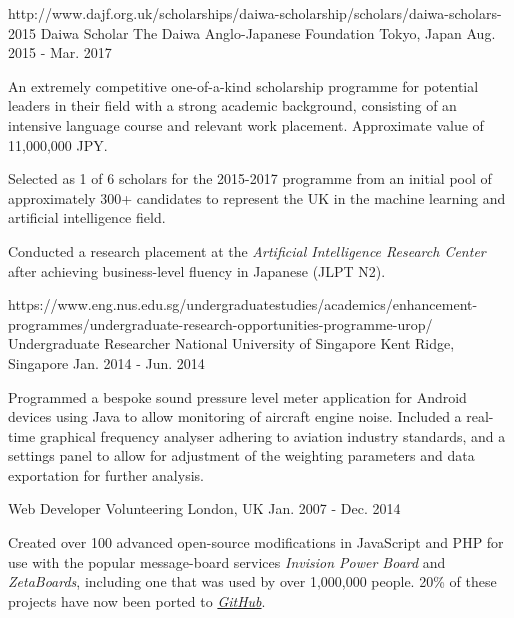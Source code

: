 \begin{cventries}
  \cventry
    {http://www.dajf.org.uk/scholarships/daiwa-scholarship/scholars/daiwa-scholars-2015}
    {Daiwa Scholar} %
    {The Daiwa Anglo-Japanese Foundation} %
    {Tokyo, Japan} %
    {Aug. 2015 - Mar. 2017} %
    {
      \begin{cvitems} %
        \item {An extremely competitive one-of-a-kind scholarship programme for potential leaders in their field with a strong academic background, consisting of an intensive language course and relevant work placement. Approximate value of 11,000,000 JPY.}
        \item {Selected as 1 of 6 scholars for the 2015-2017 programme from an initial pool of approximately 300+ candidates to represent the UK in the machine learning and artificial intelligence field.}
        \item {Conducted a research placement at the \emph{Artificial Intelligence Research Center} after achieving business-level fluency in Japanese (JLPT N2).}
      \end{cvitems}
    }

  \cventry
    {https://www.eng.nus.edu.sg/undergraduatestudies/academics/enhancement-programmes/undergraduate-research-opportunities-programme-urop/}
    {Undergraduate Researcher} %
    {National University of Singapore} %
    {Kent Ridge, Singapore} %
    {Jan. 2014 - Jun. 2014} %
    {
      \begin{cvitems} %
        \item {Programmed a bespoke sound pressure level meter application for Android devices using Java to allow monitoring of aircraft engine noise. Included a real-time graphical frequency analyser adhering to aviation industry standards, and a settings panel to allow for adjustment of the weighting parameters and data exportation for further analysis.}
      \end{cvitems}
    }

  \cventry
    {} %
    {Web Developer} %
    {Volunteering} %
    {London, UK} %
    {Jan. 2007 - Dec. 2014} %
    {
      \begin{cvitems} %
        \item {Created over 100 advanced open-source modifications in JavaScript and PHP for use with the popular message-board services \textit{Invision Power Board} and \textit{ZetaBoards}, including one that was used by over 1,000,000 people. 20\% of these projects have now been ported to \href{https://github.com/KeirSimmons/ZetaBoards}{\emph{GitHub}}.}
      \end{cvitems}
    }


\end{cventries}

